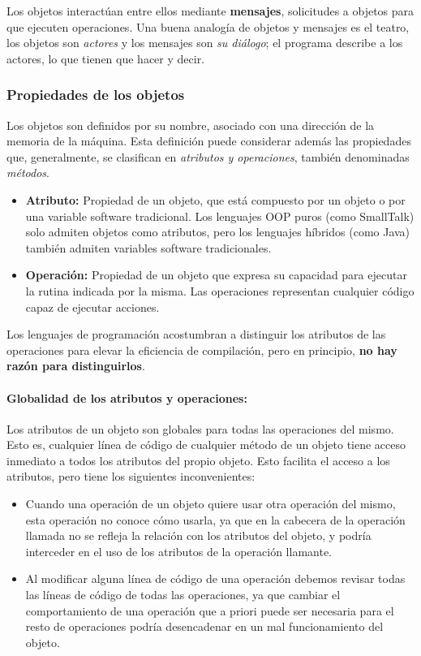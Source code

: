 \vspace{5mm}

Los objetos interactúan entre ellos mediante \textbf{mensajes},
solicitudes a objetos para que ejecuten operaciones.  Una buena
analogía de objetos y mensajes es el teatro, los objetos son
\emph{actores} y los mensajes son \emph{su diálogo}; el programa
describe a los actores, lo que tienen que hacer y decir.

\subsubsection{Propiedades de los objetos} Los objetos son definidos
por su nombre, asociado con una dirección de la memoria de la máquina.
Esta definición puede considerar además las propiedades que,
generalmente, se clasifican en \emph{atributos y operaciones}, también
denominadas \emph{métodos}.
\begin{itemize}
\item \textbf{Atributo:} Propiedad de un objeto, que está compuesto
por un objeto o por una variable software tradicional. Los lenguajes
OOP puros (como SmallTalk) solo admiten objetos como atributos, pero
los lenguajes híbridos (como Java) también admiten variables software
tradicionales.
\item \textbf{Operación: } Propiedad de un objeto que expresa su
capacidad para ejecutar la rutina indicada por la misma. Las
operaciones representan cualquier código capaz de ejecutar acciones.
\end{itemize}

\vspace{5mm}

Los lenguajes de programación acostumbran a distinguir los atributos
de las operaciones para elevar la eficiencia de compilación, pero en
principio, \textbf{no hay razón para distinguirlos}.

\vspace{5mm}

\paragraph{Globalidad de los atributos y operaciones:} Los atributos
de un objeto son globales para todas las operaciones del mismo. Esto
es, cualquier línea de código de cualquier método de un objeto tiene
acceso inmediato a todos los atributos del propio objeto. Esto
facilita el acceso a los atributos, pero tiene los siguientes
inconvenientes:
\begin{itemize}
\item Cuando una operación de un objeto quiere usar otra operación del
mismo, esta operación no conoce cómo usarla, ya que en la cabecera de
la operación llamada no se refleja la relación con los atributos del
objeto, y podría interceder en el uso de los atributos de la operación
llamante.
\item Al modificar alguna línea de código de una operación debemos
revisar todas las líneas de código de todas las operaciones, ya que
cambiar el comportamiento de una operación que a priori puede ser
necesaria para el resto de operaciones podría desencadenar en un mal
funcionamiento del objeto.
\end{itemize}

